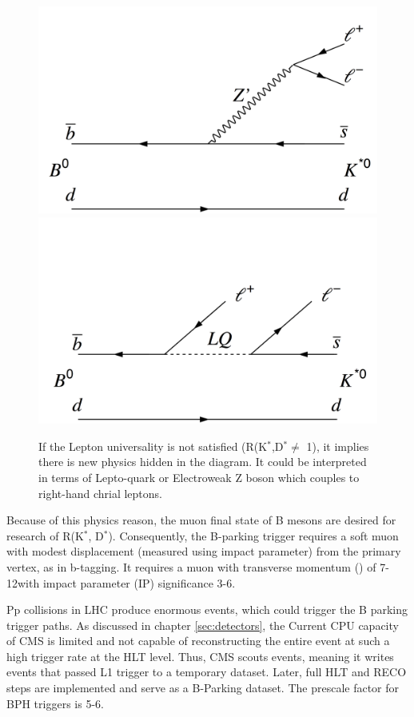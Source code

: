 \begin{figure}[h!]
	\caption{If the Lepton universality is not satisfied (R(K$^{*}$,D$^{*} \neq$ 1), it implies there is new physics hidden in the diagram. It could be interpreted in terms of Lepto-quark or Electroweak Z boson which couples to right-hand chrial leptons.\cite{Lep:2017aai}}
  \label{fig:LU2}
  \centering
  \includegraphics[width=0.57\linewidth]{figs/Fig1c.png}
  \includegraphics[width=0.57\linewidth]{figs/Fig1d.png}
\end{figure}
Because of this physics reason, the muon final state of B mesons are desired for research of R(K$^{*}$, D$^{*}$).
Consequently, the B-parking trigger requires a soft muon with modest displacement (measured using impact parameter) from the primary vertex, as in b-tagging.
It requires a muon with transverse momentum (\pt) of 7-12\GeV with impact parameter (IP) significance 3-6.

Pp collisions in LHC produce enormous events, which could trigger the B parking trigger paths.
 As discussed in chapter \ref{sec:detectors}, the Current CPU capacity of CMS is limited and not capable of reconstructing the entire event at such a high trigger rate at the HLT level.
Thus, CMS scouts events, meaning it writes events that passed L1 trigger to a temporary dataset. 
Later, full HLT and RECO steps are implemented and serve as a B-Parking dataset.
The prescale factor for BPH triggers is 5-6.

